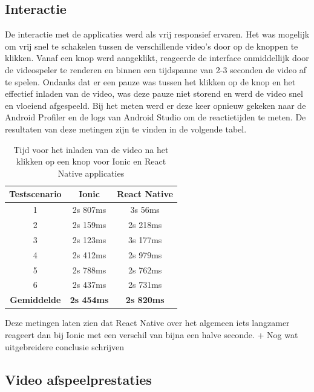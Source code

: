 \subsection{Interactie}
\label{subsec:interactie}

De interactie met de applicaties werd als vrij responsief ervaren. Het was mogelijk om vrij snel te schakelen tussen de verschillende video's door op de knoppen te klikken. Vanaf een knop werd aangeklikt, reageerde de interface onmiddellijk door de videospeler te renderen en binnen een tijdspanne van 2-3 seconden de video af te spelen. Ondanks dat er een pauze was tussen het klikken op de knop en het effectief inladen van de video, was deze pauze niet storend en werd de video snel en vloeiend afgespeeld. Bij het meten werd er deze keer opnieuw gekeken naar de Android Profiler en de logs van Android Studio om de reactietijden te meten. De resultaten van deze metingen zijn te vinden in de volgende tabel.



\begin{table}[htbp]
  \centering
  \begin{tabular}{|c|c|c|}
  \hline
  \textbf{Testscenario} & \textbf{Ionic} & \textbf{React Native} \\
  \hline
  1 & 2s 807ms & 3s 56ms \\
  \hline
  2 & 2s 159ms & 2s 218ms \\
  \hline
  3 & 2s 123ms & 3s 177ms \\
  \hline
  4 & 2s 412ms & 2s 979ms \\
  \hline
  5 & 2s 788ms & 2s 762ms \\
  \hline
  6 & 2s 437ms & 2s 731ms \\
  \hline
  \textbf{Gemiddelde} & \textbf{2s 454ms} & \textbf{2s 820ms} \\
  \hline
  \end{tabular}
  \caption{Tijd voor het inladen van de video na het klikken op een knop voor Ionic en React Native applicaties}
  \label{tab:warm_startup}
\end{table}



Deze metingen laten zien dat React Native over het algemeen iets langzamer reageert dan bij Ionic met een verschil van bijna een halve seconde.
+ Nog wat uitgebreidere conclusie schrijven
    

\subsection{Video afspeelprestaties}
\label{subsec:video-afspeelprestaties}

